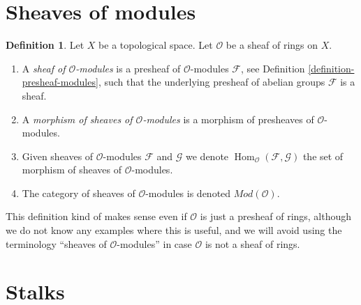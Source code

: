 \documentclass{stacks-project}
\theoremstyle{plain}
\theoremstyle{definition}
\newtheorem{definition}[subsection]{Definition}
\theoremstyle{remark}
\numberwithin{equation}{subsection}
\def\Hom{\mathop{\mathrm{Hom}}\nolimits}
\begin{document}
\section{Sheaves of modules}
\label{section-sheaves-modules}

\begin{definition}
\label{definition-sheaf-modules}
Let $X$ be a topological space.
Let $\mathcal{O}$ be a sheaf of rings on $X$.
\begin{enumerate}
\item A {\it sheaf of $\mathcal{O}$-modules} is a presheaf
of $\mathcal{O}$-modules $\mathcal{F}$,
see Definition \ref{definition-presheaf-modules},
such that the underlying presheaf of abelian groups $\mathcal{F}$
is a sheaf.
\item A {\it morphism of sheaves of $\mathcal{O}$-modules}
is a morphism of presheaves of $\mathcal{O}$-modules.
\item Given sheaves of $\mathcal{O}$-modules
$\mathcal{F}$ and $\mathcal{G}$ we denote
$\Hom_\mathcal{O}(\mathcal{F}, \mathcal{G})$
the set of morphism of sheaves of $\mathcal{O}$-modules.
\item The category of sheaves of $\mathcal{O}$-modules
is denoted $\textit{Mod}(\mathcal{O})$.
\end{enumerate}
\end{definition}

\noindent
This definition kind of makes sense even if $\mathcal{O}$ is just a
presheaf of rings, although we do not know any examples where
this is useful, and we will avoid using the terminology
``sheaves of $\mathcal{O}$-modules''
in case $\mathcal{O}$ is not a sheaf of rings.







\section{Stalks}
\label{section-stalks}
\end{document}
